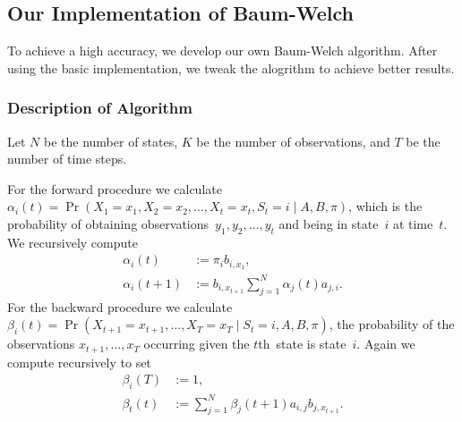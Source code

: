 \documentclass[twoside]{article}
\begin{document}
\subsection{Our Implementation of Baum-Welch}\label{sec:expl-algor}

To achieve a high accuracy, we develop our own Baum-Welch algorithm.
After using the basic implementation, we tweak the alogrithm to achieve better results.

\subsubsection{Description of Algorithm}\label{sec:description-bw}

Let $N$ be the number of states, $K$ be the number of observations, and $T$ be the number of time steps.

For the forward procedure we calculate ${\alpha_i(t) = \Pr(X_1 = x_1, X_2 = x_2, \ldots, X_t = x_t, S_t = i \mid A, B, \pi)}$, which is the probability of obtaining observations~${y_1, y_2, \ldots, y_t}$ and being in state~$i$ at time~$t$.
We recursively compute
\begin{align*}
  \alpha_i (t) &:= \pi_i b_{i, x_1},\\
  \alpha_i (t + 1) &:= b_{i, x_{t+1}} \sum_{j=1}^N \alpha_j(t) a_{j, i}.
\end{align*}
For the backward procedure we calculate ${\beta_i(t) = \Pr(X_{t+1} = x_{t+1}, \ldots, X_T = x_T \mid S_t = i, A, B, \pi)}$, the probability of the observations ${x_{t+1}, \ldots, x_T}$ occurring given the $t$th~state is state~$i$.
Again we compute recursively to set
\begin{align*}
  \beta_i(T) &:= 1,\\
  \beta_t(t) &:= \sum_{j=1}^N \beta_j(t+1) a_{i, j} b_{j, x_{t+1}}.
\end{align*}
\end{document}
